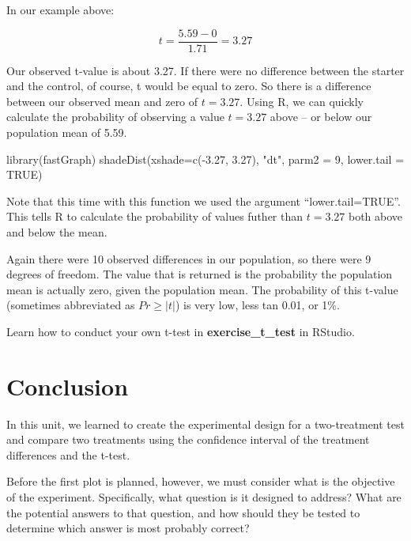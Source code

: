 \documentclass[
]{book}
\newenvironment{Shaded}{\begin{snugshade}}{\end{snugshade}}
\newcommand{\AttributeTok}[1]{\textcolor[rgb]{0.77,0.63,0.00}{#1}}
\newcommand{\ConstantTok}[1]{\textcolor[rgb]{0.00,0.00,0.00}{#1}}
\newcommand{\DecValTok}[1]{\textcolor[rgb]{0.00,0.00,0.81}{#1}}
\newcommand{\FloatTok}[1]{\textcolor[rgb]{0.00,0.00,0.81}{#1}}
\newcommand{\FunctionTok}[1]{\textcolor[rgb]{0.00,0.00,0.00}{#1}}
\newcommand{\NormalTok}[1]{#1}
\newcommand{\SpecialCharTok}[1]{\textcolor[rgb]{0.00,0.00,0.00}{#1}}
\newcommand{\StringTok}[1]{\textcolor[rgb]{0.31,0.60,0.02}{#1}}
\begin{document}
In our example above:

\[ t = \frac{5.59 - 0}{1.71} = 3.27\]

Our observed t-value is about 3.27. If there were no difference between
the starter and the control, of course, t would be equal to zero. So
there is a difference between our observed mean and zero of \(t=3.27\).
Using R, we can quickly calculate the probability of observing a value
\(t=3.27\) above -- or below our population mean of 5.59.

\begin{Shaded}
\begin{Highlighting}[]
\FunctionTok{library}\NormalTok{(fastGraph)}
\FunctionTok{shadeDist}\NormalTok{(}\AttributeTok{xshade=}\FunctionTok{c}\NormalTok{(}\SpecialCharTok{{-}}\FloatTok{3.27}\NormalTok{, }\FloatTok{3.27}\NormalTok{), }\StringTok{"dt"}\NormalTok{, }\AttributeTok{parm2 =} \DecValTok{9}\NormalTok{, }\AttributeTok{lower.tail =} \ConstantTok{TRUE}\NormalTok{)}
\end{Highlighting}
\end{Shaded}

Note that this time with this function we used the argument
``lower.tail=TRUE''. This tells R to calculate the probability of values
futher than \(t=3.27\) both above and below the mean.

Again there were 10 observed differences in our population, so there
were 9 degrees of freedom. The value that is returned is the probability
the population mean is actually zero, given the population mean. The
probability of this t-value (sometimes abbreviated as
\(Pr \ge \lvert t \lvert\)) is very low, less tan 0.01, or 1\%.

Learn how to conduct your own t-test in \textbf{exercise\_t\_test} in RStudio.

\hypertarget{conclusion}{%
\section{Conclusion}\label{conclusion}}

In this unit, we learned to create the experimental design for a
two-treatment test and compare two treatments using the confidence
interval of the treatment differences and the t-test.

Before the first plot is planned, however, we must consider what is the
objective of the experiment. Specifically, what question is it designed
to address? What are the potential answers to that question, and how
should they be tested to determine which answer is most probably
correct?
\end{document}
